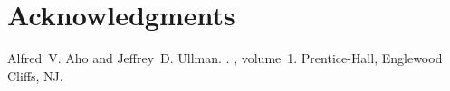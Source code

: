 \documentclass[11pt,letterpaper]{article}
\begin{document}



\section*{Acknowledgments}


\begin{thebibliography}{}

Alfred~V. Aho and Jeffrey~D. Ullman.
.
, volume~1.
\newblock Prentice-{Hall}, Englewood Cliffs, NJ.

%
%
%

\end{thebibliography}
\end{document}
